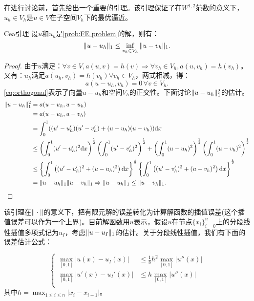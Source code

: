 在进行讨论前，首先给出一个重要的引理。该引理保证了在$W^{1,2}$范数的意义下，$u_{h}\in V_{h}$是$u\in V$在子空间$V_{h}$下的最优逼近。
\begin{lemma}{Cea引理}
  \label{lem:cea}
  设$u$和$u_{h}$是\ref{prob:FE problem}的解，则有：
  \begin{equation}
    \label{eq:cea}
    \|u-u_{h}\|_{1}\le\inf_{v_{h}\in V_{h}}\|u-v_{h}\|_{1}.
  \end{equation}
\end{lemma}
\begin{proof}
  由于$u$满足：$\forall v\in V, a(u,v)=h(v)\Rightarrow\forall v_{h}\in V_{h},a(u,v_{h})=h(v_{h})$。又有：$u_{h}$满足$a(u_{h},v_{h})=h(v_{h})\forall v_{h}\in V_{h}$，两式相减，得：
  \begin{equation}
    \label{eq:orthogonal}
    a(u-u_{h},v_{h})=0\,\forall v\in V_{h}.
  \end{equation}
  \eqref{eq:orthogonal}表示了向量$u-u_{h}$和空间$V_{h}$的正交性。下面讨论$\|u-u_{h}\|_{1}^{2}$的估计。
  \begin{equation}
    \label{eq:estimateError}
    \begin{aligned}
    \|u-u_{h}\|_{1}^{2}&=a(u-u_{h},u-u_{h})\\
    &=a(u-u_{h},u-v_{h})\\
    &=\int_{0}^{1}((u'-u_{h}')(u'-v_{h}')+(u-u_{h})(u-v_{h}))\mathrm{d} x\\
    &\le\left(\int_{0}^{1}(u'-u_{h}')^{2}\mathrm{d} x\right)^{\frac{1}{2}}\left(\int_{0}^{1}(u'-v_{h}')^{2}\right)^{\frac{1}{2}}+\left(\int_{0}^{1}(u-u_{h})^{2}\right)^{\frac{1}{2}}\left(\int_{0}^{1}(u-v_{h})^2\right)^{\frac{1}{2}}\\
    &\le\left\{\int_{0}^{1}\left((u'-u_{h}')^{2}+(u-u_{h})^{2}\right)\mathrm{d} x\right\}^{\frac{1}{2}}\left\{\int_{0}^{1}\left((u'-v_{h}')^2+(u-v_{h})^{2}\right)\mathrm{d} x\right\}^{\frac{1}{2}}\\
    &=\|u-u_{h}\|_{1}\|u-v_{h}\|_{1}\Rightarrow\|u-u_{h}\|_{1}\le\|u-v_{h}\|_{1}.\\
    \end{aligned}
  \end{equation}
\end{proof}
该引理在$\|\cdot\|$的意义下，把有限元解的误差转化为计算解函数的插值误差(这个插值误差可以作为一个上界)。目前解函数用$u$表示，假设$u$在节点$\{x_{i}\}_{i=0}^{n}$上的分段线性插值多项式记为$u_{I}$，考虑$\|u-u_{I}\|_{1}$的估计。关于分段线性插值，我们有下面的误差估计公式：
\begin{theorem}
  \label{thm:interperror}
  \begin{equation}
    \left\{
      \begin{aligned}
        \max_{[0,1]}|u(x)-u_{I}(x)|&\le\frac{1}{8}h^2\max_{[0,1]}|u''(x)|\\
        \max_{[0,1]}|u'(x)-u_{I}'(x)|&\le h\max_{[0,1]}|u''(x)|\\
      \end{aligned}
    \right.
  \end{equation}
  其中$h=\max_{1\le i\le n}|x_{i}-x_{i-1}|$。
\end{theorem}
